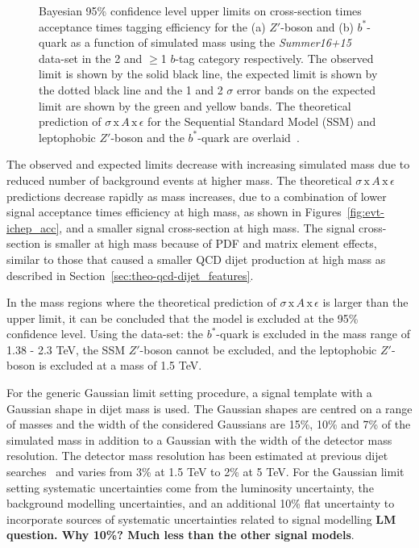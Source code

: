 \begin{figure}[!ht]
           {Bayesian 95\% confidence level upper limits on cross-section times acceptance times tagging efficiency
             for the (a) $Z'$-boson and (b) $b^*$-quark  as a function of simulated mass
             using the \textit{Summer16+15} data-set in the 2 and $\geq$1 $b$-tag category respectively.
             The observed limit is shown by the solid black line,
             the expected limit is shown by the dotted black line
             and the 1 and 2 $\sigma$ error bands on the expected limit are shown by the green and yellow bands.
             The theoretical prediction of $\sigma\,\text{x}\,\mathit{A}\,\text{x}\,\epsilon$
             for the Sequential Standard Model (SSM) and leptophobic $Z'$-boson and the $b^*$-quark are overlaid~\cite{dibjet-ichep_conf}.
           }
  \label{fig:lim-summer_benchmark}
\end{figure}

The observed and expected limits decrease with increasing simulated mass
due to reduced number of background events at higher mass.
The theoretical $\sigma\,\text{x}\,\mathit{A}\,\text{x}\,\epsilon$ predictions
decrease rapidly as mass increases, due to a combination of
lower signal acceptance times efficiency at high mass, as shown in Figures~\ref{fig:evt-ichep_acc},
and a smaller signal cross-section at high mass.
The signal cross-section is smaller at high mass because of PDF and matrix element effects,
similar to those that caused a smaller QCD dijet production at high mass as described in
 Section~\ref{sec:theo-qcd-dijet_features}.

In the mass regions where the theoretical prediction of $\sigma\,\text{x}\,\mathit{A}\,\text{x}\,\epsilon$
is larger than the upper limit, it can be concluded that the model is excluded at the 95\% confidence level.
Using the \summer{} data-set:
the \mbox{$b^*$-quark} is excluded in the mass range of 1.38 - 2.3 TeV,
the SSM $Z'$-boson cannot be excluded,
and the leptophobic $Z'$-boson is excluded at a mass of 1.5 TeV.

\FloatBarrier

For the generic Gaussian limit setting procedure,
a signal template with a Gaussian shape in dijet mass is used.
The Gaussian shapes are centred on a range of masses
and the width of the considered Gaussians are
15\%, 10\% and 7\% of the simulated mass
in addition to a Gaussian with the width of the detector mass resolution.
The detector mass resolution has been estimated
at previous dijet searches~\cite{dijet-mori16_paper}
and varies from 3\% at 1.5 TeV to 2\% at 5 TeV.
For the Gaussian limit setting
systematic uncertainties come from the luminosity uncertainty,
the background modelling uncertainties,
and an additional 10\% flat uncertainty to
incorporate sources of systematic uncertainties related to signal modelling
\textbf{LM question. Why 10\%? Much less than the other signal models}.

